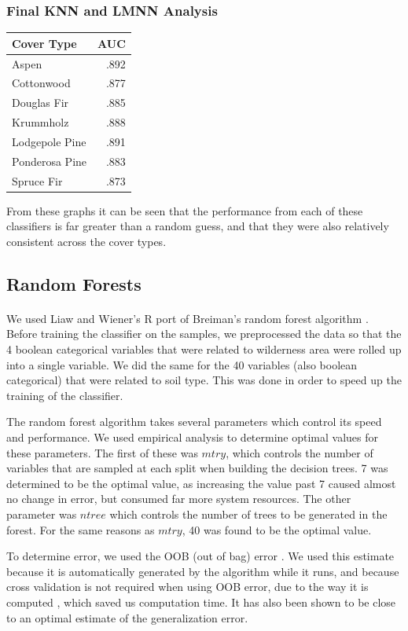 \documentclass[11pt]{article}
\begin{document}
\subsubsection{Final KNN and LMNN Analysis}

\begin{center}
  \begin{tabular}{ l | r}
    \hline
    Cover Type & AUC \\ \hline

    Aspen & .892 \\ \hline
    Cottonwood & .877 \\ \hline
    Douglas Fir & .885 \\ \hline
    Krummholz & .888 \\ \hline
    Lodgepole Pine & .891 \\ \hline
    Ponderosa Pine & .883 \\ \hline
    Spruce Fir & .873 \\ \hline
  \end{tabular}
\end{center}
From these graphs it can be seen that the performance from each of these classifiers is far greater than a random guess, and that they were also relatively consistent across the cover types.

\subsection{Random Forests}
\paragraph{}
We used Liaw and Wiener's R port \cite{liaw02} of Breiman's random forest algorithm \cite{breiman01}. Before training the classifier on the samples, we preprocessed the data so that the 4 boolean categorical variables that were related to wilderness area were rolled up into a single variable. We did the same for the 40 variables (also boolean categorical) that were related to soil type. This was done in order to speed up the training of the classifier.
\par
The random forest algorithm takes several parameters which control its speed and performance. We used empirical analysis to determine optimal values for these parameters. The first of these was $mtry$, which controls the number of variables that are sampled at each split when building the decision trees. 7 was determined to be the optimal value, as increasing the value past 7 caused almost no change in error, but consumed far more system resources. The other parameter was $ntree$ which controls the number of trees to be generated in the forest. For the same reasons as $mtry$, 40 was found to be the optimal value.
\par
To determine error, we used the OOB (out of bag) error \cite{breiman96}. We used this estimate because it is automatically generated by the algorithm while it runs, and because cross validation is not required when using OOB error, due to the way it is computed \cite{breiman01, breiman96}, which saved us computation time. It has also been shown to be close to an optimal estimate of the generalization error\cite{breiman96}.
\end{document}
